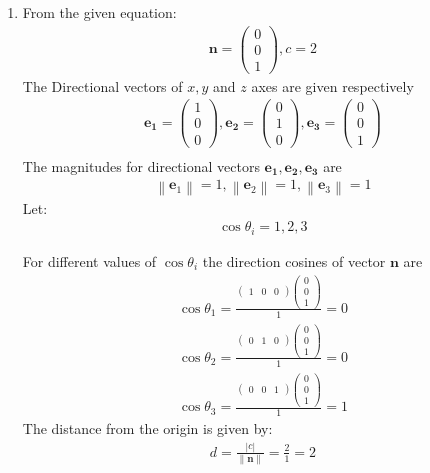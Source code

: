 \documentclass[12pt]{article}
\providecommand{\norm}[1]{\left\lVert#1\right\rVert}
\newcommand{\myvec}[1]{\ensuremath{\begin{pmatrix}#1\end{pmatrix}}}
\let\vec\mathbf
\begin{document}
\begin{enumerate}
\item From the given equation:
	\begin{align}
		\vec{n}=\myvec{0\\0\\1},c=2
			\end{align}
			The Directional vectors of $x,y$ and $z$ axes are given respectively 
			\begin{align}
			\vec{e_1}=\myvec{1\\0\\0},\vec{e_2}=\myvec{0\\1\\0},\vec{e_3}=\myvec{0\\0\\1}\\
			\end{align}
			The magnitudes for directional vectors $\vec{e_1},\vec{e_2},\vec{e_3}$ are
			\begin{align}
			\norm{\vec{e}_1}=1,\norm{\vec{e}_2}=1,\norm{\vec{e}_3}=1
			\end{align}
	Let:
	\begin{align}
	\cos\theta_i=1,2,3
	\end{align}
	
		For different values of $\cos\theta_i$ the direction cosines of vector $\vec{n}$ are
		\begin{align}
			\cos\theta_1=\frac{\myvec{1&0&0}\myvec{0 \\ 0\\1}}{1}=0\\
			\cos\theta_2=\frac{\myvec{0&1&0}\myvec{0 \\ 0\\1}}{1}=0\\
			\cos\theta_3=\frac{\myvec{0&0&1}\myvec{0\\0\\1}}{1}=1
		\end{align}
	The distance from the origin is given by:
		\begin{align}
			d=\frac{|c|}{\norm{\vec{n}}}=\frac{2}{1}=2
		\end{align}


\end{enumerate}
\end{document}
